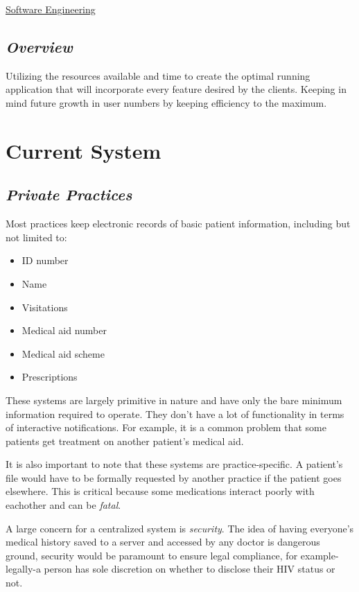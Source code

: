 \documentclass[a4paper]{article}
\begin{document}
\href{ https://cle.wits.ac.za/access/content/group/COMS3009_2016/book-SE_marsic.pdf}{Software Engineering}
		
\subsection{\textit{Overview}}

Utilizing the resources available and time to create the optimal running application that will incorporate every feature desired by the clients. Keeping in mind future growth in user numbers by keeping efficiency to the maximum.

\newpage

\section{Current System}
\subsection{\textit{Private Practices}}
Most practices keep electronic records of basic patient information, including but not limited to:
\begin{itemize}
	\item ID number
	\item Name
	\item Visitations
	\item Medical aid number
	\item Medical aid scheme
	\item Prescriptions
\end{itemize}
These systems are largely primitive in nature and have only the bare minimum information required to operate. They don't have a lot of functionality in terms of interactive notifications. For example, it is a common problem that some patients get treatment on another patient's medical aid.

It is also important to note that these systems are practice-specific. A patient's file would have to be formally requested by another practice if the patient goes elsewhere. This is critical because some medications interact poorly with eachother and can be \emph{fatal}.

A large concern for a centralized system is \emph{security}. The idea of having everyone's medical history saved to a server and accessed by any doctor is dangerous ground, security would be paramount to ensure legal compliance, for example-legally-a person has sole discretion on whether to disclose their HIV status or not.
\end{document}
